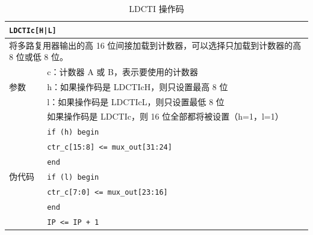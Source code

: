 \documentclass[main\_\_CN.tex]{subfiles}
\begin{document}
\begin{table}[H]
\caption{LDCTI 操作码}
\label{tab:bitscrm-ldcti-opcode}
\begin{tabular}{|l|l|}
\hline
\multicolumn{2}{|l|}{\texttt{LDCTIc[H|L]}} \\
\hline
\multicolumn{2}{|L{17cm}|}{将多路复用器输出的高 16 位间接加载到计数器，可以选择只加载到计数器的高 8 位或低 8 位。} \\
\hline
\multirow{3}{*}{参数} & c：计数器 A 或 B，表示要使用的计数器 \\
& h：如果操作码是 LDCTIcH，则只设置最高 8 位 \\
& l：如果操作码是 LDCTIcL，则只设置最低 8 位 \\
& 如果操作码是 LDCTIc，则 16 位全部都将被设置（h=1，l=1） \\
\hline
\multirow{7}{*}{伪代码} & \texttt{if (h) begin} \\
& \hspace*{4mm} \texttt{ctr\_c[15:8] <= mux\_out[31:24]} \\
& \texttt{end} \\
& \texttt{if (l) begin} \\
& \hspace*{4mm} \texttt{ctr\_c[7:0] <= mux\_out[23:16]} \\
& \texttt{end} \\
& \texttt{IP <= IP + 1} \\
\hline
\end{tabular}
\end{table}
\end{document}
